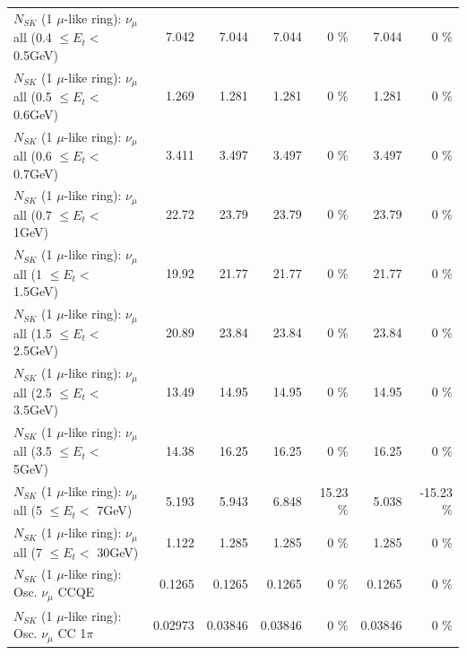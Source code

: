 \begin{table}
\begin{tabular}{| l | r | r | r  r | r  r |}
       $N_{SK}$ (1 $\mu$-like ring): $\nu_{\mu}$ all (0.4 $\leq E_{t} <$ 0.5GeV) &           7.042 &           7.044 &           7.044 &        0 \%  &           7.044 &        0 \%  \\ 
       $N_{SK}$ (1 $\mu$-like ring): $\nu_{\mu}$ all (0.5 $\leq E_{t} <$ 0.6GeV) &           1.269 &           1.281 &           1.281 &        0 \%  &           1.281 &        0 \%  \\ 
       $N_{SK}$ (1 $\mu$-like ring): $\nu_{\mu}$ all (0.6 $\leq E_{t} <$ 0.7GeV) &           3.411 &           3.497 &           3.497 &        0 \%  &           3.497 &        0 \%  \\ 
         $N_{SK}$ (1 $\mu$-like ring): $\nu_{\mu}$ all (0.7 $\leq E_{t} <$ 1GeV) &           22.72 &           23.79 &           23.79 &        0 \%  &           23.79 &        0 \%  \\ 
         $N_{SK}$ (1 $\mu$-like ring): $\nu_{\mu}$ all (1 $\leq E_{t} <$ 1.5GeV) &           19.92 &           21.77 &           21.77 &        0 \%  &           21.77 &        0 \%  \\ 
       $N_{SK}$ (1 $\mu$-like ring): $\nu_{\mu}$ all (1.5 $\leq E_{t} <$ 2.5GeV) &           20.89 &           23.84 &           23.84 &        0 \%  &           23.84 &        0 \%  \\ 
       $N_{SK}$ (1 $\mu$-like ring): $\nu_{\mu}$ all (2.5 $\leq E_{t} <$ 3.5GeV) &           13.49 &           14.95 &           14.95 &        0 \%  &           14.95 &        0 \%  \\ 
         $N_{SK}$ (1 $\mu$-like ring): $\nu_{\mu}$ all (3.5 $\leq E_{t} <$ 5GeV) &           14.38 &           16.25 &           16.25 &        0 \%  &           16.25 &        0 \%  \\ 
           $N_{SK}$ (1 $\mu$-like ring): $\nu_{\mu}$ all (5 $\leq E_{t} <$ 7GeV) &           5.193 &           5.943 &           6.848 &    15.23 \%  &           5.038 &   -15.23 \%  \\ 
          $N_{SK}$ (1 $\mu$-like ring): $\nu_{\mu}$ all (7 $\leq E_{t} <$ 30GeV) &           1.122 &           1.285 &           1.285 &        0 \%  &           1.285 &        0 \%  \\ 
\hline
\hline
                               $N_{SK}$ (1 $\mu$-like ring): Osc. $\nu_\mu$ CCQE &          0.1265 &          0.1265 &          0.1265 &        0 \%  &          0.1265 &        0 \%  \\ 
                          $N_{SK}$ (1 $\mu$-like ring): Osc. $\nu_\mu$ CC 1$\pi$ &         0.02973 &         0.03846 &         0.03846 &        0 \%  &         0.03846 &        0 \%  \\ 

\end{tabular}
\end{table}
